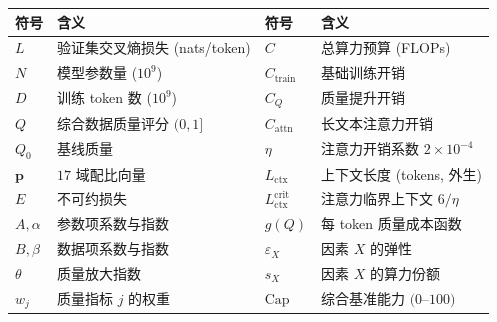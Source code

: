 \documentclass[zihao=-4,a4paper]{ctexart}
\newcommand{\Dt}{D}
\newcommand{\Lctx}{L_{\mathrm{ctx}}}
\newcommand{\Ctrain}{C_{\mathrm{train}}}
\newcommand{\Cattn}{C_{\mathrm{attn}}}
\begin{document}
\begin{table}[!htbp]
  \centering
  \songti{}
  \begin{tabular}{@{}>{\centering\arraybackslash}p{1.2cm}>{\raggedright\arraybackslash}p{5.3cm}>{\centering\arraybackslash}p{3.9cm}>{\raggedright\arraybackslash}p{4.6cm}@{}}
    \toprule
    符号 & 含义 & 符号 & 含义 \\
    \midrule
    $L$ & 验证集交叉熵损失 (\mbox{nats/token}) & $C$ & 总算力预算 (FLOPs) \\
    $N$ & 模型参数量 ($10^9$) & $\Ctrain$ & 基础训练开销 \\
    $\Dt$ & 训练 token 数 ($10^9$) & $C_Q$ & 质量提升开销 \\
    $Q$ & 综合数据质量评分 $(0,1]$ & $\Cattn$ & 长文本注意力开销 \\
    $Q_0$ & 基线质量 & $\eta$ & 注意力开销系数 $2\times10^{-4}$ \\
    $\bm p$ & $17$ 域配比向量 & $\Lctx$ & 上下文长度 (tokens, 外生) \\
    $E$ & 不可约损失 & $\Lctx^{\mathrm{crit}}$ & 注意力临界上下文 $6/\eta$ \\
    $A,\alpha$ & 参数项系数与指数 & $g(Q)$ & 每 token 质量成本函数 \\
    $B,\beta$ & 数据项系数与指数 & $\varepsilon_X$ & 因素 $X$ 的弹性 \\
    $\theta$ & 质量放大指数 & $s_X$ & 因素 $X$ 的算力份额 \\
    $w_j$ & 质量指标 $j$ 的权重 & $\mathrm{Cap}$ & 综合基准能力 $(0$--$100)$ \\
    \bottomrule
  \end{tabular}
\end{table}





\begingroup
\let\FloatBarrier\relax

\endgroup


\FloatBarrier
\clearpage

\clearpage


\end{document}
